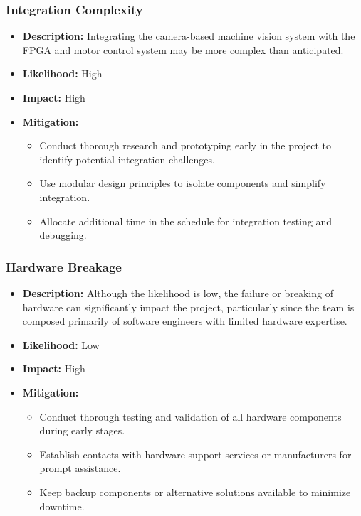 \documentclass{article}
\begin{document}
\subsubsection{Integration Complexity}
\begin{itemize}
    \item \textbf{Description:} Integrating the camera-based machine vision system with the FPGA and motor control system may be more complex than anticipated.
    \item \textbf{Likelihood:} High
    \item \textbf{Impact:} High
    \item \textbf{Mitigation:}
        \begin{itemize}
            \item Conduct thorough research and prototyping early in the project to identify potential integration challenges.
            \item Use modular design principles to isolate components and simplify integration.
            \item Allocate additional time in the schedule for integration testing and debugging.
        \end{itemize}
\end{itemize}

\subsubsection{Hardware Breakage}
\begin{itemize}
    \item \textbf{Description:} Although the likelihood is low, the failure or breaking of hardware can significantly impact the project, particularly since the team is composed primarily of software engineers with limited hardware expertise.
    \item \textbf{Likelihood:} Low
    \item \textbf{Impact:} High
    \item \textbf{Mitigation:}
        \begin{itemize}
            \item Conduct thorough testing and validation of all hardware components during early stages.
            \item Establish contacts with hardware support services or manufacturers for prompt assistance.
            \item Keep backup components or alternative solutions available to minimize downtime.
        \end{itemize}
\end{itemize}
\end{document}
